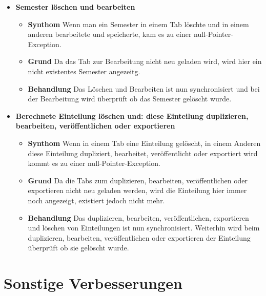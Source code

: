 \documentclass[parskip=full]{scrartcl}
\newcommand{\fehler}[4]{\textbf{#1}
 							\begin{itemize}
 							  \item \textbf{Synthom}  #2
 							  \item \textbf{Grund} #3
 							  \item \textbf{Behandlung} #4
 							\end{itemize}}
\newcommand{\code}[1]{{\ttfamily #1}}
\begin{document}
\begin{itemize}
{    kann man das aktive Semester nun nur noch umstellen, wenn die
    Einteilungswarteschlange leer ist.}
    \item \fehler{Semester löschen und bearbeiten}{Wenn man ein Semester in
    einem Tab löschte und in einem anderen bearbeitete und speicherte, kam es zu
    einer \code{null}-Pointer-Exception. }{Da das Tab zur Bearbeitung nicht
    neu geladen wird, wird hier ein nicht existentes Semester angezeitg.}{Das
    Löschen und Bearbeiten ist nun synchronisiert und bei der Bearbeitung wird
    überprüft ob das Semester gelöscht wurde.}
    \item \fehler{Berechnete Einteilung löschen und: diese Einteilung
    duplizieren, bearbeiten, veröffentlichen oder exportieren}{Wenn in
    einem Tab eine Einteilung gelöscht, in einem Anderen diese Einteilung
    dupliziert, bearbeitet, veröffentlicht oder exportiert wird kommt es zu
    einer \code{null}-Pointer-Exception. }{Da die Tabs zum duplizieren,
    bearbeiten, veröffentlichen oder exportieren nicht neu geladen werden,
    wird die Einteilung hier immer noch angezeigt, existiert jedoch nicht
    mehr.}{Das duplizieren, bearbeiten, veröffentlichen, exportieren und
    löschen von Einteilungen ist nun synchronisiert. Weiterhin wird beim
    duplizieren, bearbeiten, veröffentlichen oder exportieren der Einteilung
    überprüft ob sie gelöscht wurde.}
\end{itemize}


\section{Sonstige Verbesserungen}
\end{document}
